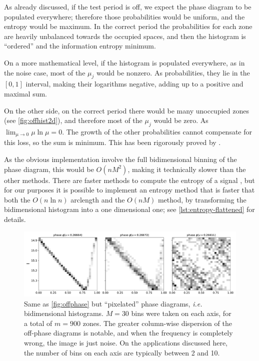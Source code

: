 	As already discussed, if the test period is off, we expect the phase diagram to be populated everywhere; 
	therefore those probabilities would be uniform, and the entropy would be maximum.
	In the correct period the probabilities for each zone are heavily unbalanced towards the occupied spaces,
	and then the histogram is \enquote{ordered} and the information entropy minimum.
	
	On a more mathematical level, if the histogram is populated everywhere, as in the noise case, 
	most of the $\mu_j$ would be nonzero. As probabilities, they lie in the $[0,1]$ interval, 
	making their logarithms negative, adding up to a positive and maximal sum.
	
	On the other side, on the correct period there would be many unoccupied zones (see \autoref{fig:offhist2d}), 
	and therefore most of the $\mu_j$ would be zero. As $\lim_{\mu\to0}\mu \ln \mu = 0$.
	The growth of the other probabilities cannot compensate for this loss, so the sum is minimum.	
	This has been rigorously proved by \cite{Cincotta1999II}.

	As the obvious implementation involve the full bidimensional binning of the phase diagram, 
	this would be $O(nM^2)$, making it technically slower than the other methods.
	There are faster methods to compute the entropy of a signal \citep{Cohen1985}, 
	but for our purposes it is possible to implement an entropy method that is faster that both 
	the $O(n\ln n)$ arclength and the $O(nM)$ method, by transforming the bidimensional histogram into a one dimensional one;
	see \autoref{lst:entropy-flattened} for details.
	
	\begin{figure}
		\centering
		\includegraphics[width=\textwidth]{img/offhist2d.pdf}
		\caption[Off-frequency phase diagrams: histograms]{
			Same as \autoref{fig:offphase} but \enquote{pixelated} phase diagrams, \textit{i.e.} bidimensional histograms.
			$M=30$ bins were taken on each axis, for a total of $m=900$ zones.
			The greater column-wise dispersion of the off-phase diagrams is notable, 
			and when the frequency is completely wrong, the image is just noise.
			On the applications discussed here, the number of bins on each axis are typically between 2 and 10.
		}
		\label{fig:offhist2d}
	\end{figure}
	